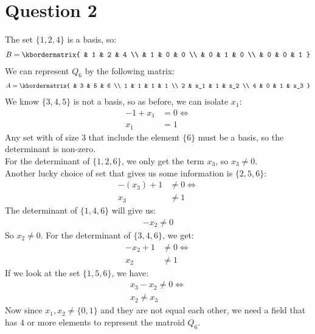 \documentclass[a4paper, fleqn]{article}
\begin{document}
\section*{Question 2}
The set $\{1,2,4\}$ is a basis, so:
\begin{align*}
  B =
  \kbordermatrix{
    & 1 & 2 & 4 \\
    & 1 & 0 & 0 \\
    & 0 & 1 & 0 \\
    & 0 & 0 & 1
  }
\end{align*}
We can represent $Q_6$ by the following matrix:
\begin{align*}
  A=\kbordermatrix{
    &   3 & 5 & 6 \\
    1 & 1 & 1 & 1 \\
    2 & x_1 & 1 & x_2 \\
    4 & 0 & 1 & x_3
  }
\end{align*}
We know $\{3,4,5\}$ is not a basis, so as before, we can isolate $x_1$:
\begin{align*}
  -1+x_1&=0 \Leftrightarrow \\
  x_1&=1
\end{align*}
Any set with of size $3$ that include the element $\{6\}$ must be a basis, so the
determinant is non-zero. \\
For the determinant of $\{1,2,6\}$, we only get the term $x_3$, so $x_3\neq 0$. \\
Another lucky choice of set that gives us some information is $\{2,5,6\}$:
\begin{align*}
  -(x_3)+1&\neq 0 \Leftrightarrow \\
  x_3 &\neq 1
\end{align*}
The determinant of $\{1,4,6\}$ will give us:
\begin{align*}
  -x_2 \neq 0
\end{align*}
So $x_2\neq 0$. For the determinant of $\{3,4,6\}$, we get:
\begin{align*}
  -x_2+1&\neq 0 \Leftrightarrow \\
  x_2&\neq 1
\end{align*}
If we look at the set $\{1,5,6\}$, we have:
\begin{align*}
  x_3-x_2 \neq 0 \Leftrightarrow \\
  x_2 \neq x_3
\end{align*}
Now since $x_1,x_2\neq \{0,1\}$ and they are not equal each other, we need a field that
has $4$ or more elements to represent the matroid $Q_6$.
\end{document}
